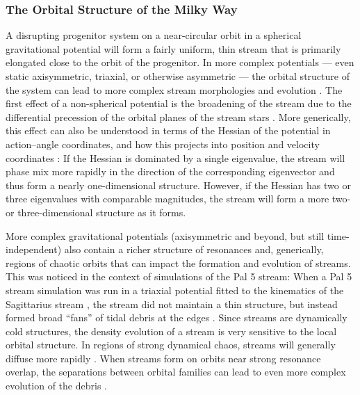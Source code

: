 \documentclass[final,5p,times,twocolumn,authoryear]{elsarticle}
\begin{document}



\subsubsection{The Orbital Structure of the Milky Way}

A disrupting progenitor system on a near-circular orbit in a spherical gravitational
potential will form a fairly uniform, thin stream that is primarily elongated close to
the orbit of the progenitor.
In more complex potentials --- even static axisymmetric, triaxial, or otherwise
asymmetric --- the orbital structure of the system can lead to more complex stream
morphologies and evolution \citep[e.g.,][]{amorisco:2015b}.
The first effect of a non-spherical potential is the broadening of the stream due to the
differential precession of the orbital planes of the stream stars \citep{erkal:2016b}.
More generically, this effect can also be understood in terms of the Hessian of the
potential in action--angle coordinates, and how this projects into position and velocity
coordinates \citep{sanders:2013a}: If the Hessian is dominated by a single eigenvalue,
the stream will phase mix more rapidly in the direction of the corresponding eigenvector
and thus form a nearly one-dimensional structure.
However, if the Hessian has two or three eigenvalues with comparable magnitudes, the
stream will form a more two- or three-dimensional structure as it forms.

More complex gravitational potentials (axisymmetric and beyond, but still
time-independent) also contain a richer structure of resonances and, generically,
regions of chaotic orbits that can impact the formation and evolution of streams.
This was noticed in the context of simulations of the Pal 5 stream: When a Pal 5 stream
simulation was run in a triaxial potential fitted to the kinematics of the Sagittarius
stream \citep{law:2010}, the stream did not maintain a thin structure, but instead
formed broad ``fans'' of tidal debris at the edges \citep{pearson:2015}.
Since streams are dynamically cold structures, the density evolution of a stream is very
sensitive to the local orbital structure.
In regions of strong dynamical chaos, streams will generally diffuse more rapidly
\citep{price-whelan:2016a, mestre:2020}.
When streams form on orbits near strong resonance overlap, the separations between
orbital families can lead to even more complex evolution of the debris
\citep{yavetz:2021,yavetz:2023}.
\end{document}
